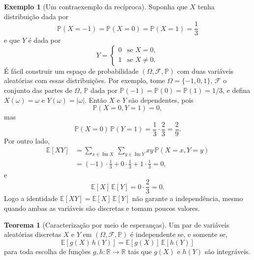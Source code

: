 \documentclass[12pt,portuguese]{article}
\theoremstyle{definition}
\newtheorem{theorem}{Teorema}
\newtheorem{example}[example]{Exemplo}
\begin{document}
\begin{example}[Um contraexemplo da recíproca]\label{ex:correlacao-nao-independencia}
Suponha que $X$ tenha distribuição dada por
\[
\mathbb{P}(X = -1) = \mathbb{P}(X = 0) = \mathbb{P}(X = 1) = \frac{1}{3}
\]
e que $Y$ é dada por
\[
Y = \begin{cases} 0 & \text{se } X = 0, \\ 1 & \text{se } X \neq 0. \end{cases}
\]
É fácil construir um espaço de probabilidade $(\Omega,\mathcal{F},\mathbb{P})$
com duas variáveis aleatórias com essas distribuições. Por exemplo, tome
$\Omega = \{-1, 0, 1\}$, $\mathcal{F}$ o conjunto das partes de $\Omega$,
$\mathbb{P}$ dada por $\mathbb{P}(-1) = \mathbb{P}(0) = \mathbb{P}(1) = 1/3$, e
defina $X(\omega) = \omega$ e $Y(\omega) = |\omega|$. Então $X$ e $Y$ são
dependentes, pois
\[
\mathbb{P}(X = 0, Y = 1) = 0,
\]
mas
\[
\mathbb{P}(X = 0)\,\mathbb{P}(Y = 1) = \frac{1}{3}\cdot\frac{2}{3} = \frac{2}{9}.
\]
Por outro lado,
\begin{align*}
\mathbb{E}[XY]
&= \sum_{x\in\operatorname{Im}X}\ \sum_{y\in\operatorname{Im}Y}
xy\,\mathbb{P}(X = x, Y = y)
\\[0.3cm]
&= (-1)\cdot\frac{1}{3} + 0\cdot\frac{1}{3} + 1\cdot\frac{1}{3} = 0,
\end{align*}
e
\[
\mathbb{E}[X]\,\mathbb{E}[Y] = 0\cdot\frac{2}{3} = 0.
\]
Logo a identidade $\mathbb{E}[XY] = \mathbb{E}[X]\,\mathbb{E}[Y]$ não garante a
independência, mesmo quando ambas as variáveis são discretas e tomam poucos
valores.
\end{example}


\begin{theorem}[Caracterização por meio de esperanças]\label{thm:esperanca-produto-funcoes}
Um par de variáveis aleatórias discretas $X$ e $Y$ em $(\Omega,\mathcal{F},\mathbb{P})$
é independente se, e somente se,
\begin{equation}\label{eq:produto-funcoes}
\mathbb{E}[g(X)\,h(Y)] = \mathbb{E}[g(X)]\,\mathbb{E}[h(Y)]
\end{equation}
para toda escolha de funções $g, h : \mathbb{R} \to \mathbb{R}$ tais que
$g(X)$ e $h(Y)$ são integráveis.
\end{theorem}
\end{document}
